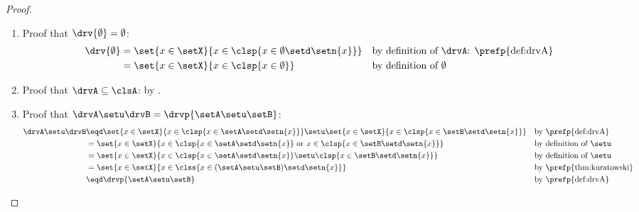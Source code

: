 \begin{proof}
\begin{enumerate}
  \item Proof that $\drv{\emptyset}=\emptyset$:
        \begin{align*}
          \drv{\emptyset}
            &= \set{x\in\setX}{x\in\clsp{x\in\emptyset\setd\setn{x}}}
            && \text{by definition of $\drvA$: \prefp{def:drvA}}
          \\&= \set{x\in\setX}{x\in\clsp{x\in\emptyset}}
            && \text{by definition of $\emptyset$}
        \end{align*}
  
  \item Proof that $\drvA\subseteq\clsA$: by .


  \item Proof that $\drvA\setu\drvB=\drvp{\setA\setu\setB}$:\label{item:kuratowski_drv_setu}
    \begin{align*}
      \drvA\setu\drvB
        &\eqd \set{x\in\setX}{x\in\clsp{x\in\setA\setd\setn{x}}} \setu
              \set{x\in\setX}{x\in\clsp{x\in\setB\setd\setn{x}}}
        &&    \text{by \prefp{def:drvA}}
      \\&=    \set{x\in\setX}{x\in\clsp{x\in\setA\setd\setn{x}} \text{ or } x\in\clsp{x\in\setB\setd\setn{x}}}
        &&    \text{by definition of $\setu$}
      \\&=    \set{x\in\setX}{x\in\clsp{x\in\setA\setd\setn{x}}\setu\clsp{x\in\setB\setd\setn{x}}}
        &&    \text{by definition of $\setu$}
      \\&=    \set{x\in\setX}{x\in\clss{x\in(\setA\setu\setB)\setd\setn{x}}}
        &&    \text{by \prefp{thm:kuratowski}} %
      \\&\eqd \drvp{\setA\setu\setB}
        &&    \text{by \prefp{def:drvA}}
    \end{align*}


\end{enumerate}
\end{proof}
